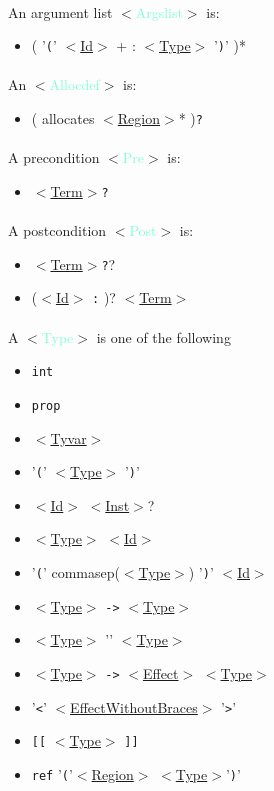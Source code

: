 \documentclass[a4paper]{scrreprt}
\newcommand{\cat}[1]{$<$\hyperref[#1]{#1}$>$}
\newcommand{\likecat}[1]{$<$\textcolor{Aquamarine}{#1}$>$}
\newcommand{\catdef}[1]{\label{#1}\likecat{#1}}
\begin{document}
\paragraph{}
An argument list \catdef{Argslist} is:
\begin{itemize}
  \item ( '{\tt (}' \cat{Id} + : \cat{Type} '{\tt )}' )*
\end{itemize}

\paragraph{}
An \catdef{Allocdef} is:
\begin{itemize}
  \item ( allocates \cat{Region}* ){\tt ?}
\end{itemize}

\paragraph{}
A precondition \catdef{Pre} is:
\begin{itemize}
  \item \cat{Term}{\tt ?}
\end{itemize}

\paragraph{}
A postcondition \catdef{Post} is:
\begin{itemize}
  \item \cat{Term}{\tt ?}?
  \item (\cat{Id} {\tt :} )? \cat{Term}
\end{itemize}


\paragraph{}
A \catdef{Type} is one of the following
\begin{itemize}
  \item {\tt int}
  \item {\tt prop}
  \item \cat{Tyvar}
  \item '{\tt (}' \cat{Type} '{\tt )}'
  \item \cat{Id} \cat{Inst}?
  \item \cat{Type} \cat{Id}
  \item '{\tt (}' commasep(\cat{Type}) '{\tt )}' \cat{Id}
  \item \cat{Type} {\tt ->} \cat{Type}
  \item \cat{Type} '{\tt *}' \cat{Type}
  \item \cat{Type} {\tt ->} \cat{Effect} \cat{Type}
  \item '{\tt <}' \cat{EffectWithoutBraces} '{\tt >}'
  \item {\tt [[} \cat{Type} {\tt ]]}
  \item {\tt ref} '{\tt (}'\cat{Region} \cat{Type}'{\tt )}'
\end{itemize}
\end{document}
